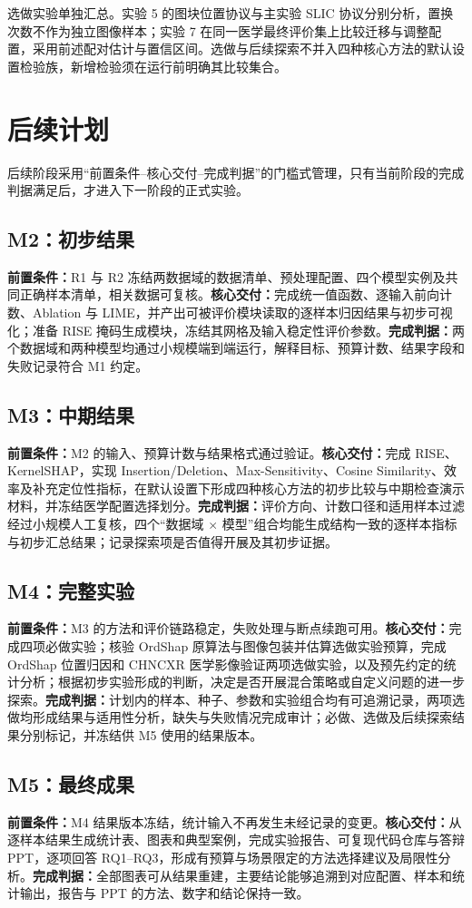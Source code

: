 选做实验单独汇总。实验 5 的图块位置协议与主实验 SLIC 协议分别分析，置换次数不作为独立图像样本；实验 7 在同一医学最终评价集上比较迁移与调整配置，采用前述配对估计与置信区间。选做与后续探索不并入四种核心方法的默认设置检验族，新增检验须在运行前明确其比较集合。

\chapter{后续计划}

后续阶段采用“前置条件--核心交付--完成判据”的门槛式管理，只有当前阶段的完成判据满足后，才进入下一阶段的正式实验。

\section{M2：初步结果}

\textbf{前置条件：}R1 与 R2 冻结两数据域的数据清单、预处理配置、四个模型实例及共同正确样本清单，相关数据可复核。\textbf{核心交付：}完成统一值函数、逐输入前向计数、Ablation 与 LIME，并产出可被评价模块读取的逐样本归因结果与初步可视化；准备 RISE 掩码生成模块，冻结其网格及输入稳定性评价参数。\textbf{完成判据：}两个数据域和两种模型均通过小规模端到端运行，解释目标、预算计数、结果字段和失败记录符合 M1 约定。

\section{M3：中期结果}

\textbf{前置条件：}M2 的输入、预算计数与结果格式通过验证。\textbf{核心交付：}完成 RISE、KernelSHAP，实现 Insertion/Deletion、Max-Sensitivity、Cosine Similarity、效率及补充定位性指标，在默认设置下形成四种核心方法的初步比较与中期检查演示材料，并冻结医学配置选择划分。\textbf{完成判据：}评价方向、计数口径和适用样本过滤经过小规模人工复核，四个“数据域 $\times$ 模型”组合均能生成结构一致的逐样本指标与初步汇总结果；记录探索项是否值得开展及其初步证据。

\section{M4：完整实验}

\textbf{前置条件：}M3 的方法和评价链路稳定，失败处理与断点续跑可用。\textbf{核心交付：}完成四项必做实验；核验 OrdShap 原算法与图像包装并估算选做实验预算，完成 OrdShap 位置归因和 CHNCXR 医学影像验证两项选做实验，以及预先约定的统计分析；根据初步实验形成的判断，决定是否开展混合策略或自定义问题的进一步探索。\textbf{完成判据：}计划内的样本、种子、参数和实验组合均有可追溯记录，两项选做均形成结果与适用性分析，缺失与失败情况完成审计；必做、选做及后续探索结果分别标记，并冻结供 M5 使用的结果版本。

\section{M5：最终成果}

\textbf{前置条件：}M4 结果版本冻结，统计输入不再发生未经记录的变更。\textbf{核心交付：}从逐样本结果生成统计表、图表和典型案例，完成实验报告、可复现代码仓库与答辩 PPT，逐项回答 RQ1--RQ3，形成有预算与场景限定的方法选择建议及局限性分析。\textbf{完成判据：}全部图表可从结果重建，主要结论能够追溯到对应配置、样本和统计输出，报告与 PPT 的方法、数字和结论保持一致。
